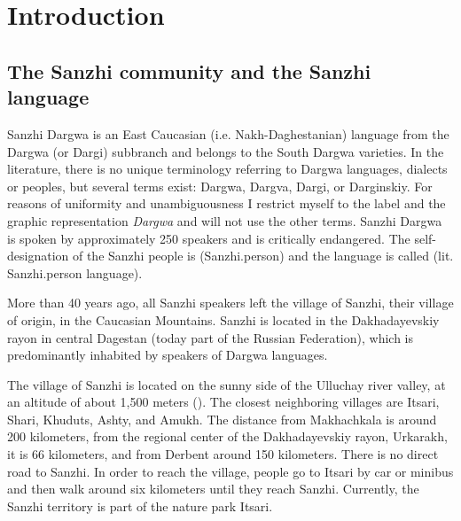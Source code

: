 
\chapter{Introduction}
\label{cpt:Introduction}


\section{The Sanzhi community and the Sanzhi language}
\label{sec:The Sanzhi community and the Sanzhi language}

Sanzhi Dargwa is an East Caucasian (i.e. Nakh-Daghestanian) language from the Dargwa (or Dargi) subbranch and belongs to the South Dargwa varieties. In the literature, there is no unique terminology referring to Dargwa languages, dialects or peoples, but several terms exist: Dargwa, Dargva, Dargi, or Darginskiy. For reasons of uniformity and unambiguousness I restrict myself to the label and the graphic representation \textit{Dargwa} and will not use the other terms. Sanzhi Dargwa is spoken by approximately 250 speakers and is critically endangered. The self-designation of the Sanzhi people is  (Sanzhi.person) and the language is called  (lit. Sanzhi.person language).

More than 40 years ago, all Sanzhi speakers left the village of Sanzhi, their village of origin, in the Caucasian Mountains. Sanzhi is located in the Dakhadayevskiy rayon in central Dagestan (today part of the Russian Federation), which is predominantly inhabited by speakers of Dargwa languages.

The village of Sanzhi is located on the sunny side of the Ulluchay river valley, at an altitude of about 1,500 meters (). The closest neighboring villages are Itsari, Shari, Khuduts, Ashty, and Amukh. The distance from Makhachkala is around 200 kilometers, from the regional center of the Dakhadayevskiy rayon, Urkarakh, it is 66 kilometers, and from Derbent around 150 kilometers. There is no direct road to Sanzhi. In order to reach the village, people go to Itsari by car or minibus and then walk around six kilometers until they reach Sanzhi. Currently, the Sanzhi territory is part of the nature park Itsari.

